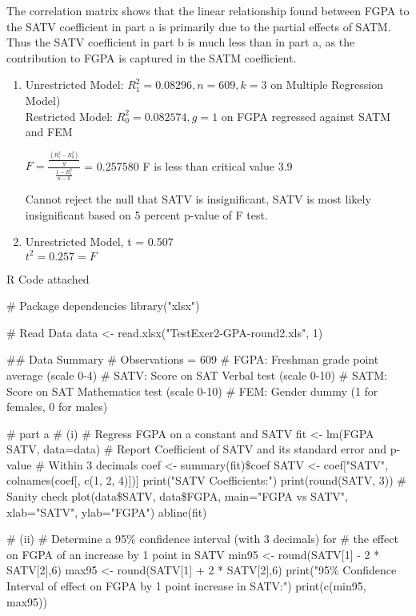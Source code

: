 \documentclass{article}
\begin{document}
\begin{flushleft}
\begin{enumerate}[label=(\alph*)]
	The correlation matrix shows that the linear relationship found between FGPA to the SATV coefficient in part a is primarily  due to the partial effects of SATM. Thus the SATV coefficient in part b is much less than in part a, as the contribution to FGPA is captured in the SATM coefficient.
	
	\begin{enumerate}[label=(\roman*)]
	\item
	Unrestricted Model: $R_{1}^{2} = 0.08296, n = 609, k = 3$ on Multiple Regression Model)\\
	Restricted Model:  $R_{0}^{2} = 0.082574, g = 1$ on FGPA regressed against SATM and FEM
	
	$F = \frac{\frac{(R_{1}^{2}-R_{0}^{2})}{g}}{\frac{1-R_{1}^{2}}{n-k}}$ = 0.257580
	F is less than critical value 3.9
	
	Cannot reject the null that SATV is insignificant, SATV is most likely insignificant based on 5 percent p-value of F test.
	
	\item
	Unrestricted Model, t = 0.507\\
	$ t^{2} = 0.257 = F$
	 
	\end{enumerate}
	
	
	\bigskip
R Code attached
	
\# Package dependencies
library("xlsx")

\# Read Data
data <- read.xlsx("TestExer2-GPA-round2.xls", 1)

\#\# Data Summary
\# Observations = 609
\# FGPA: Freshman grade point average (scale 0-4)
\# SATV: Score on SAT Verbal test (scale 0-10)
\# SATM: Score on SAT Mathematics test (scale 0-10)
\# FEM: Gender dummy (1 for females, 0 for males)

\# part a 
\# (i)
\# Regress FGPA on a constant and SATV
fit <- lm(FGPA ~ SATV, data=data)
\# Report Coefficient of SATV and its standard error and p-value
\# Within 3 decimals
coef <- summary(fit)\$coef
SATV <- coef["SATV", colnames(coef[, c(1, 2, 4)])]
print("SATV Coefficients:")
print(round(SATV, 3))
\# Sanity check
plot(data\$SATV, data\$FGPA, main="FGPA vs SATV", xlab="SATV", ylab="FGPA")
abline(fit)

\# (ii)
\# Determine a 95\% confidence interval (with 3 decimals) for
\# the effect on FGPA of an increase by 1 point in SATV
min95 <- round(SATV[1] - 2 * SATV[2],6)
max95 <- round(SATV[1] + 2 * SATV[2],6)
print("95\% Confidence Interval of effect on FGPA by 1 point increase in SATV:")
print(c(min95, max95))


\end{enumerate}
\end{flushleft}
\end{document}
